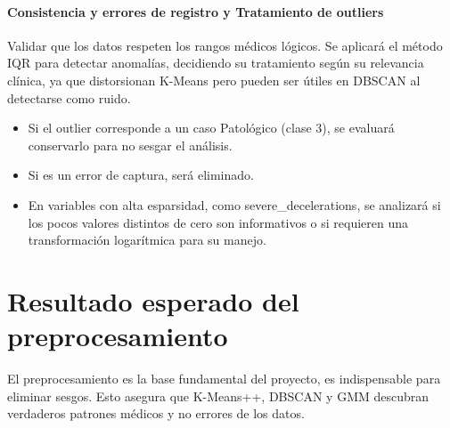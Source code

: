 \documentclass[12pt,letterpaper]{article}
\begin{document}
\paragraph{Consistencia y errores de registro y Tratamiento de outliers}
Validar que los datos respeten los rangos médicos lógicos. Se aplicará el método IQR para detectar anomalías, decidiendo su tratamiento según su relevancia clínica, ya que distorsionan K-Means pero pueden ser útiles en DBSCAN al detectarse como ruido.

\begin{itemize}[leftmargin=2em, itemsep=4pt]
  \item Si el outlier corresponde a un caso Patológico (clase 3), se evaluará conservarlo para no sesgar el análisis.
  \item Si es un error de captura, será eliminado.
  \item En variables con alta esparsidad, como severe\_decelerations, se analizará si los pocos valores distintos de cero son informativos o si requieren una transformación logarítmica para su manejo.
\end{itemize}

\section{Resultado esperado del preprocesamiento}
El preprocesamiento es la base fundamental del proyecto, es indispensable para eliminar sesgos. Esto asegura que K-Means++, DBSCAN y GMM descubran verdaderos patrones médicos y no errores de los datos.
\end{document}

